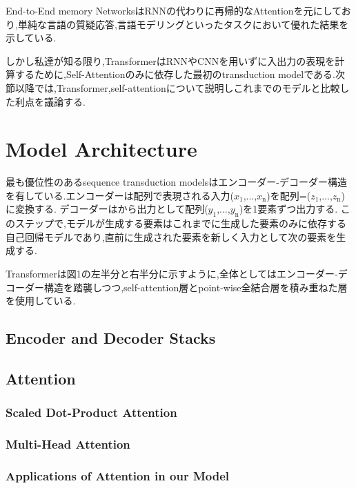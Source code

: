 \documentclass[twocolumn]{jarticle}     %
\begin{document}
End-to-End memory NetworksはRNNの代わりに再帰的なAttentionを元にしており,単純な言語の質疑応答,言語モデリングといったタスクにおいて優れた結果を示している.\par

しかし私達が知る限り,TransformerはRNNやCNNを用いずに入出力の表現を計算するために,Self-Attentionのみに依存した最初のtransduction modelである.次節以降では,Transformer,self-attentionについて説明しこれまでのモデルと比較した利点を議論する.




\section{Model Architecture}
最も優位性のあるsequence transduction modelsはエンコーダー-デコーダー構造を有している.エンコーダーは配列で表現される入力($x_\mathrm{1}$,...,$x_\mathrm{n}$)を配列=($z_\mathrm{1}$,...,$z_\mathrm{n}$)に変換する.
デコーダーはから出力として配列($y_\mathrm{1}$,...,$y_\mathrm{n}$)を1要素ずつ出力する.
このステップで,モデルが生成する要素はこれまでに生成した要素のみに依存する自己回帰モデルであり,直前に生成された要素を新しく入力として次の要素を生成する.\par
Transformerは図1の左半分と右半分に示すように,全体としてはエンコーダー-デコーダー構造を踏襲しつつ,self-attention層とpoint-wise全結合層を積み重ねた層を使用している.

\subsection{Encoder and Decoder Stacks}

\subsection{Attention}

\subsubsection{Scaled Dot-Product Attention}

\subsubsection{Multi-Head Attention}

\subsubsection{Applications of Attention in our Model}
\end{document}
